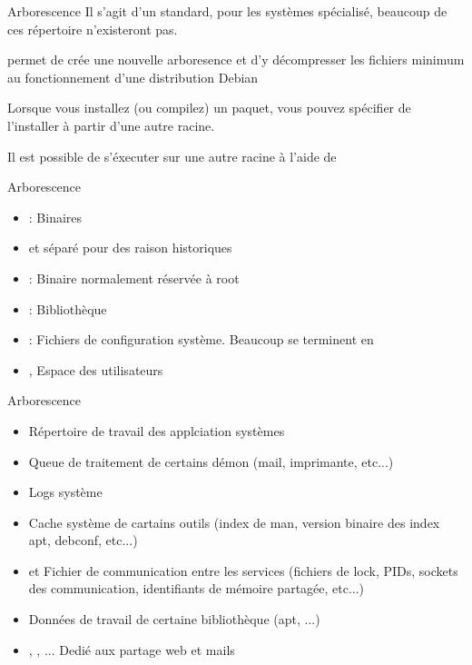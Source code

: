 \begin{frame}[fragile=singleslide]{Arborescence}
  Il s'agit  d'un standard, pour les systèmes  spécialisé, beaucoup de
  ces répertoire n'existeront pas.

   permet de crée une nouvelle arboresence et d'y
  décompresser   les   fichiers   minimum  au   fonctionnement   d'une
  distribution Debian

  Lorsque  vous  installez  (ou   compilez)  un  paquet,  vous  pouvez
  spécifier de l'installer à partir d'une autre racine.

  Il  est possible  de s'éxecuter  sur une  autre racine  à  l'aide de
\end{frame}

\begin{frame}[fragile=singleslide]{Arborescence}
  \begin{itemize}
  \item {}   : Binaires
  \item \file{/} et  séparé pour des raison historiques
  \item {}: Binaire normalement réservée à root
  \item {} : Bibliothèque
  \item  {}:  Fichiers  de  configuration système.  Beaucoup  se
    terminent en 
  \item {},  Espace des utilisateurs
  \end{itemize}
\end{frame}

\begin{frame}[fragile=singleslide]{Arborescence}
  \begin{itemize}
  \item {} Répertoire de travail des applciation systèmes
  \item {}  Queue de  traitement de certains  démon (mail,
    imprimante, etc...)
  \item {} Logs système
  \item {} Cache système de cartains outils (index de man,
    version binaire des index apt, debconf, etc...)
  \item {}  et   Fichier de communication  entre les
    services  (fichiers  de  lock,  PIDs, sockets  des  communication,
    identifiants de mémoire partagée, etc...)
  \item {} Données de travail de certaine bibliothèque (apt,
    ...)
  \item  {}, ,  ...  Dedié aux  partage web  et
    mails
  \end{itemize}
\end{frame}

